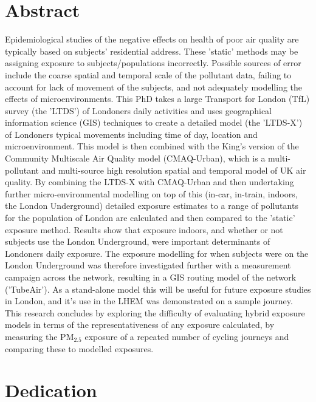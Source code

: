 \documentclass[12pt]{report}
\author{James D Smith, MSc, BA, PgCert, PgDip \vspace{2cm} \\ 
\multicolumn{1}{p{.7\textwidth}}{\centering Environmental Research Group, School of Analytical \& Environmental Sciences, Faculty of Life Sciences \& Medicine, King's College London}}
\date{Thesis submitted to King's College London in fulfillment of the requirements for the degree of Doctor of Philosophy \vspace{2cm} \\ 
July 2018}
\begin{document}
\maketitle

\chapter*{Abstract}
Epidemiological studies of the negative effects on health of poor air quality are typically based on subjects' residential address. These 'static' methods may be assigning exposure to subjects/populations incorrectly. Possible sources of error include the coarse spatial and temporal scale of the pollutant data, failing to account for lack of movement of the subjects, and not adequately modelling the effects of microenvironments. This PhD takes a large Transport for London (TfL) survey (the 'LTDS') of Londoners daily activities and uses geographical information science (GIS) techniques to create a detailed model (the 'LTDS-X') of Londoners typical movements including time of day, location and microenvironment. This model is then combined with the King’s version of the Community Multiscale Air Quality model (CMAQ-Urban), which is a multi-pollutant and multi-source high resolution spatial and temporal model of UK air quality. By combining the LTDS-X with CMAQ-Urban and then undertaking further micro-environmental modelling on top of this (in-car, in-train, indoors, the London Underground) detailed exposure estimates to a range of pollutants for the population of London are calculated and then compared to the 'static' exposure method. Results show that exposure indoors, and whether or not subjects use the London Underground, were important determinants of Londoners daily exposure. The exposure modelling for when subjects were on the London Underground was therefore investigated further with a measurement campaign across the network, resulting in a GIS routing model of the network ('TubeAir'). As a stand-alone model this will be useful for future exposure studies in London, and it’s use in the LHEM was demonstrated on a sample journey. This research concludes by exploring the difficulty of evaluating hybrid exposure models in terms of the representativeness of any exposure calculated, by measuring the PM$_{2.5}$ exposure of a repeated number of cycling journeys and comparing these to modelled exposures.

\chapter*{Dedication}
\end{document}
